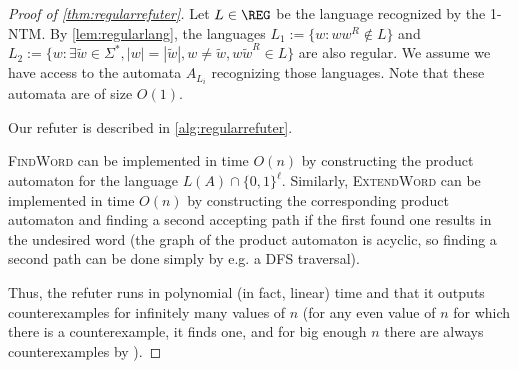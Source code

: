 \begin{proof}[Proof of \cref{thm:regularrefuter}]
Let $L \in \REG$ be the language recognized by the 1-NTM. By \cref{lem:regularlang}, the languages 
$L_1 := \{w : ww^R \not\in L\}$ and $L_2 := \{w : \exists \tilde{w} \in \Sigma^*, |w| = |\tilde{w}|, w \neq \tilde{w}, w\tilde{w}^R \in L\}$
are also regular. We assume we have access to the automata $A_{L_i}$ recognizing those languages. Note that these automata are of size $O(1)$.



Our refuter is described in \cref{alg:regularrefuter}.

\begin{algorithm}
\caption{Refuter of \cref{thm:regularrefuter}}\label{alg:regularrefuter}
\begin{algorithmic}

\end{algorithmic}
\end{algorithm}

\textsc{FindWord} can be implemented in time $O(n)$ by constructing the product automaton for the language $L(A) \cap \{0, 1\}^\ell$. 
Similarly, \textsc{ExtendWord} can be implemented in time $O(n)$ by constructing the corresponding product automaton and finding a 
second accepting path if the first found one results in the undesired word (the graph of the product automaton is acyclic, so finding
a second path can be done simply by e.g. a DFS traversal). 

Thus, the refuter runs in polynomial (in fact, linear) time and that it outputs counterexamples for infinitely many values of $n$
(for any even value of $n$ for which there is a counterexample, it finds one, and for big enough $n$ there are always counterexamples by ).
\end{proof}

